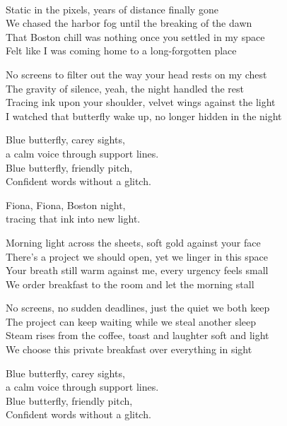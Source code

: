 \begin{lyrics}

\\
Static in the pixels, years of distance finally gone\\
We chased the harbor fog until the breaking of the dawn\\
That Boston chill was nothing once you settled in my space\\
Felt like I was coming home to a long-forgotten place

No screens to filter out the way your head rests on my chest\\
The gravity of silence, yeah, the night handled the rest\\
Tracing ink upon your shoulder, velvet wings against the light\\
I watched that butterfly wake up, no longer hidden in the night

Blue butterfly, carey sights,\\
a calm voice through support lines.\\
Blue butterfly, friendly pitch,\\
Confident words without a glitch.

Fiona, Fiona, Boston night,\\
tracing that ink into new light.

Morning light across the sheets, soft gold against your face\\
There’s a project we should open, yet we linger in this space\\
Your breath still warm against me, every urgency feels small\\
We order breakfast to the room and let the morning stall

No screens, no sudden deadlines, just the quiet we both keep\\
The project can keep waiting while we steal another sleep\\
Steam rises from the coffee, toast and laughter soft and light\\
We choose this private breakfast over everything in sight

Blue butterfly, carey sights,\\
a calm voice through support lines.\\
Blue butterfly, friendly pitch,\\
Confident words without a glitch.


\end{lyrics}
